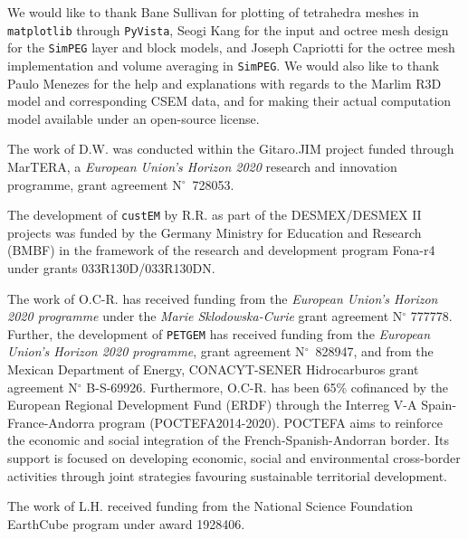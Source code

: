 \documentclass[extra, camera,%
]{gji}
\newcommand{\simpeg}{\texttt{SimPEG}\xspace}
\newcommand{\custem}{\texttt{custEM}\xspace}
\newcommand{\petgem}{\texttt{PETGEM}\xspace}
\begin{document}
\begin{acknowledgments}

We would like to thank Bane Sullivan for plotting of tetrahedra meshes in \texttt{matplotlib} through \texttt{PyVista}, Seogi Kang for the input and octree mesh design for the \simpeg layer and block models, and Joseph Capriotti for the octree mesh implementation and volume averaging in \simpeg. We would also like to thank Paulo Menezes for the help and explanations with regards to the Marlim R3D model and corresponding CSEM data, and for making their actual computation model available under an open-source license.

The work of D.W. was conducted within the Gitaro.JIM project funded through MarTERA, a \emph{European Union's Horizon 2020} research and innovation programme, grant agreement N$^\circ$~728053.

The development of \custem by R.R. as part of the DESMEX/DESMEX II projects was funded by the Germany Ministry for Education and Research (BMBF) in the framework of the research and development program Fona-r4 under grants 033R130D/033R130DN.

The work of O.C-R. has received funding from the \emph{European Union's Horizon 2020 programme} under the \emph{Marie Sklodowska-Curie} grant agreement N$^\circ$ 777778. Further, the development of \petgem has received funding from the \emph{European Union's Horizon 2020 programme}, grant agreement N$^\circ$~828947, and from the Mexican Department of Energy, CONACYT-SENER Hidrocarburos grant agreement N$^\circ$ B-S-69926. Furthermore, O.C-R. has been 65\% cofinanced by the European Regional Development Fund (ERDF) through the Interreg V-A Spain-France-Andorra program (POCTEFA2014-2020). POCTEFA aims to reinforce the economic and social integration of the French-Spanish-Andorran border. Its support is focused on developing economic, social and environmental cross-border activities through joint strategies favouring sustainable territorial development.

The work of L.H. received funding from the National Science Foundation EarthCube program under award 1928406.
\end{acknowledgments}




\label{lastpage}
\end{document}
